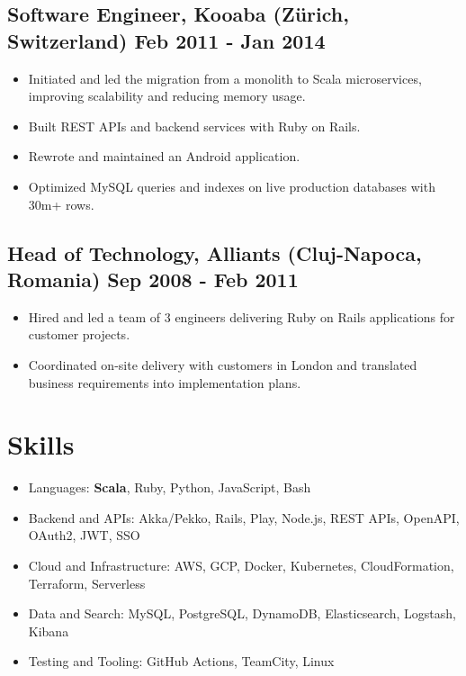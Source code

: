\documentclass[11pt,a4paper]{article}
\begin{document}
\subsection*{Software Engineer, Kooaba (Zürich, Switzerland) \hfill Feb 2011 - Jan 2014}
\begin{itemize}
  \item Initiated and led the migration from a monolith to Scala microservices, improving scalability and reducing memory usage.
  \item Built REST APIs and backend services with Ruby on Rails.
  \item Rewrote and maintained an Android application.
  \item Optimized MySQL queries and indexes on live production databases with 30m+ rows.
\end{itemize}

\subsection*{Head of Technology, Alliants (Cluj-Napoca, Romania) \hfill Sep 2008 - Feb 2011}
\begin{itemize}
  \item Hired and led a team of 3 engineers delivering Ruby on Rails applications for customer projects.
  \item Coordinated on-site delivery with customers in London and translated business requirements into implementation plans.
\end{itemize}

\section*{Skills}
\begin{itemize}
  \item Languages: \textbf{Scala}, Ruby, Python, JavaScript, Bash
  \item Backend and APIs: Akka/Pekko, Rails, Play, Node.js, REST APIs, OpenAPI, OAuth2, JWT, SSO
  \item Cloud and Infrastructure: AWS, GCP, Docker, Kubernetes, CloudFormation, Terraform, Serverless
  \item Data and Search: MySQL, PostgreSQL, DynamoDB, Elasticsearch, Logstash, Kibana
  \item Testing and Tooling: GitHub Actions, TeamCity, Linux
\end{itemize}
\end{document}
